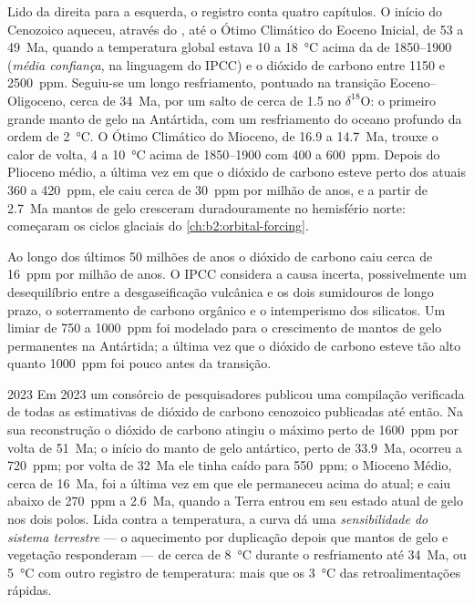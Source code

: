 Lido da direita para a esquerda, o registro conta quatro capítulos. O início do Cenozoico aqueceu, através do
, até o Ótimo Climático do Eoceno Inicial, de 53 a \qty{49}{Ma}, quando
a temperatura global estava 10 a \qty{18}{\celsius} acima da de 1850--1900 (\emph{média
confiança}, na linguagem do IPCC) e o dióxido de carbono entre 1150 e \qty{2500}{ppm}.
Seguiu-se um longo resfriamento, pontuado na transição Eoceno--Oligoceno, cerca de \qty{34}{Ma}, por um
salto de cerca de \qty{1.5}{\permil} no $\delta^{18}$O: o primeiro grande manto de gelo na Antártida, com um
resfriamento do oceano profundo da ordem de \qty{2}{\celsius}. O Ótimo Climático do Mioceno, de 16.9 a
\qty{14.7}{Ma}, trouxe o calor de volta, 4 a \qty{10}{\celsius} acima de 1850--1900 com 400 a
\qty{600}{ppm}. Depois do Plioceno médio, a última vez em que o dióxido de carbono esteve perto dos atuais 360 a
\qty{420}{ppm}, ele caiu cerca de \qty{30}{ppm} por milhão de anos, e a partir de \qty{2.7}{Ma} mantos de gelo
cresceram duradouramente no hemisfério norte: começaram os ciclos glaciais do \cref{ch:b2:orbital-forcing}.

Ao longo dos últimos 50 milhões de anos o dióxido de carbono caiu cerca de \qty{16}{ppm} por milhão de
anos. O IPCC considera a causa incerta, possivelmente um desequilíbrio entre a desgaseificação vulcânica e os
dois sumidouros de longo prazo, o soterramento de carbono orgânico e o intemperismo dos silicatos. Um limiar de 750 a
\qty{1000}{ppm} foi modelado para o crescimento de mantos de gelo permanentes na Antártida; a última vez que o
dióxido de carbono esteve tão alto quanto \qty{1000}{ppm} foi pouco antes da transição.

\begin{dated}{2023}
Em 2023 um consórcio de pesquisadores publicou uma compilação verificada de todas as estimativas de dióxido de carbono
cenozoico publicadas até então. Na sua reconstrução o dióxido de carbono atingiu o máximo perto de \qty{1600}{ppm} por volta de
\qty{51}{Ma}; o início do manto de gelo antártico, perto de \qty{33.9}{Ma}, ocorreu a \qty{720}{ppm}; por volta de
\qty{32}{Ma} ele tinha caído para \qty{550}{ppm}; o Mioceno Médio, cerca de \qty{16}{Ma}, foi a última
vez em que ele permaneceu acima do atual; e caiu abaixo de \qty{270}{ppm} a \qty{2.6}{Ma}, quando a Terra
entrou em seu estado atual de gelo nos dois polos. Lida contra a temperatura, a curva dá uma
\emph{sensibilidade do sistema terrestre} --- o aquecimento por duplicação depois que mantos de gelo e vegetação
responderam --- de cerca de \qty{8}{\celsius} durante o resfriamento até \qty{34}{Ma}, ou \qty{5}{\celsius}
com outro registro de temperatura: mais que os \qty{3}{\celsius} das retroalimentações rápidas.
\end{dated}

